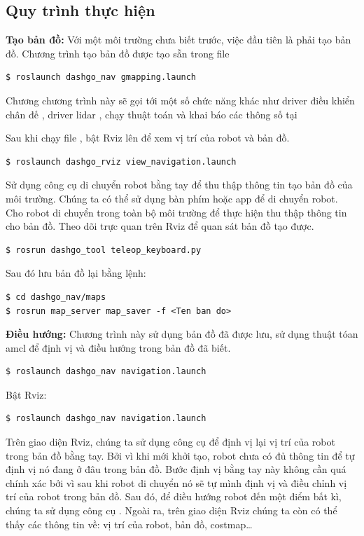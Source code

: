 \subsection{Quy trình thực hiện}

\textbf{Tạo bản đồ:} Với một môi trường chưa biết trước, việc đầu tiên là phải tạo bản đồ.
Chương trình tạo bản đồ được tạo sẵn trong file 

\begin{lstlisting}
$ roslaunch dashgo_nav gmapping.launch
\end{lstlisting}

Chương chương trình này sẽ gọi tới một số chức năng khác như driver điều khiển chân đế , driver lidar , chạy thuật toán và khai báo các thông số tại 

Sau khi chạy file , bật Rviz lên để xem vị trí của robot và bản đồ.
\begin{lstlisting}
$ roslaunch dashgo_rviz view_navigation.launch
\end{lstlisting}


Sử dụng công cụ di chuyển robot bằng tay để thu thập thông tin tạo bản đồ của môi trường. Chúng ta có thể sử dụng bàn phím hoặc app để di chuyển robot. Cho robot di chuyển trong toàn bộ môi trường để thực hiện thu thập thông tin cho bản đồ. Theo dõi trực quan trên Rviz để quan sát bản đồ tạo được.
\begin{lstlisting}
$ rosrun dashgo_tool teleop_keyboard.py
\end{lstlisting}

Sau đó lưu bản đồ lại bằng lệnh:
\begin{lstlisting}
$ cd dashgo_nav/maps
$ rosrun map_server map_saver -f <Ten ban do>
\end{lstlisting}

\textbf{Điều hướng:} Chương trình này sử dụng bản đồ đã được lưu, sử dụng thuật tóan amcl để định vị và điều hướng trong bản đồ đã biết.
\begin{lstlisting}
$ roslaunch dashgo_nav navigation.launch
\end{lstlisting}

Bật Rviz:
\begin{lstlisting}
$ roslaunch dashgo_nav navigation.launch
\end{lstlisting}
Trên giao diện Rviz, chúng ta sử dụng công cụ  để định vị lại vị trí của robot trong bản đồ bằng tay.
Bởi vì khi mới khởi tạo, robot chưa có đủ thông tin để tự định vị nó đang ở đâu trong bản đồ. Bước định vị bằng tay này không cần quá chính xác bởi vì sau khi robot di chuyển nó sẽ tự mình định vị và điều chỉnh vị trí của robot trong bản đồ. Sau đó, để điều hướng robot đến một điểm bất kì, chúng ta sử dụng công cụ . Ngoài ra, trên giao diện Rviz chúng ta còn có thể thấy các thông tin về: vị trí của robot, bản đồ, costmap\dots

